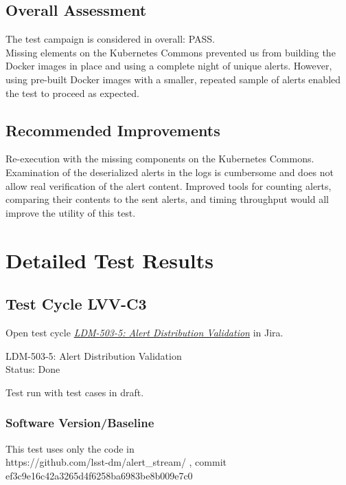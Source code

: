\documentclass[DM,lsstdraft,STR,toc]{lsstdoc}
\begin{document}
\subsection{Overall Assessment}
\label{sect:overallassessment}

The test campaign is considered in overall:
PASS.\\[2\baselineskip]Missing elements on the Kubernetes Commons
prevented us from building the Docker images in place and using a
complete night of unique alerts. However, using pre-built Docker images
with a smaller, repeated sample of alerts enabled the test to proceed as
expected.


\subsection{Recommended Improvements}
\label{sect:recommendations}

Re-execution with the missing components on the Kubernetes
Commons.\\[2\baselineskip]Examination of the deserialized alerts in the
logs is cumbersome and does not allow real verification of the alert
content. Improved tools for counting alerts, comparing their contents to
the sent alerts, and timing throughput would all improve the utility of
this test.


\newpage
\section{Detailed Test Results}
\label{sect:detailedtestresults}


  \subsection{Test Cycle LVV-C3 }

Open test cycle {\it \href{https://jira.lsstcorp.org/secure/Tests.jspa#/testrun/LVV-C3}{LDM-503-5: Alert Distribution Validation}} in Jira.

  LDM-503-5: Alert Distribution Validation\\
  Status: Done

  Test run with test cases in draft.


  \subsubsection{Software Version/Baseline}
    This test uses only the code in\\
https://github.com/lsst-dm/alert\_stream/ , commit
ef3c9e16c42a3265d4f6258ba6983be8b009e7c0
\end{document}

